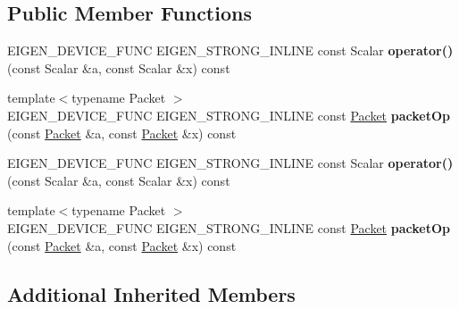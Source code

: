 \subsection*{Public Member Functions}
\begin{DoxyCompactItemize}
\item 
\mbox{\label{struct_eigen_1_1internal_1_1scalar__igammac__op_a3a4928ec0ff01a9934267792838c2eda}} 
E\+I\+G\+E\+N\+\_\+\+D\+E\+V\+I\+C\+E\+\_\+\+F\+U\+NC E\+I\+G\+E\+N\+\_\+\+S\+T\+R\+O\+N\+G\+\_\+\+I\+N\+L\+I\+NE const Scalar {\bfseries operator()} (const Scalar \&a, const Scalar \&x) const
\item 
\mbox{\label{struct_eigen_1_1internal_1_1scalar__igammac__op_a0f697a457a319ce7a678617e74cb0a3d}} 
{\footnotesize template$<$typename Packet $>$ }\\E\+I\+G\+E\+N\+\_\+\+D\+E\+V\+I\+C\+E\+\_\+\+F\+U\+NC E\+I\+G\+E\+N\+\_\+\+S\+T\+R\+O\+N\+G\+\_\+\+I\+N\+L\+I\+NE const \hyperlink{union_eigen_1_1internal_1_1_packet}{Packet} {\bfseries packet\+Op} (const \hyperlink{union_eigen_1_1internal_1_1_packet}{Packet} \&a, const \hyperlink{union_eigen_1_1internal_1_1_packet}{Packet} \&x) const
\item 
\mbox{\label{struct_eigen_1_1internal_1_1scalar__igammac__op_a3a4928ec0ff01a9934267792838c2eda}} 
E\+I\+G\+E\+N\+\_\+\+D\+E\+V\+I\+C\+E\+\_\+\+F\+U\+NC E\+I\+G\+E\+N\+\_\+\+S\+T\+R\+O\+N\+G\+\_\+\+I\+N\+L\+I\+NE const Scalar {\bfseries operator()} (const Scalar \&a, const Scalar \&x) const
\item 
\mbox{\label{struct_eigen_1_1internal_1_1scalar__igammac__op_a0f697a457a319ce7a678617e74cb0a3d}} 
{\footnotesize template$<$typename Packet $>$ }\\E\+I\+G\+E\+N\+\_\+\+D\+E\+V\+I\+C\+E\+\_\+\+F\+U\+NC E\+I\+G\+E\+N\+\_\+\+S\+T\+R\+O\+N\+G\+\_\+\+I\+N\+L\+I\+NE const \hyperlink{union_eigen_1_1internal_1_1_packet}{Packet} {\bfseries packet\+Op} (const \hyperlink{union_eigen_1_1internal_1_1_packet}{Packet} \&a, const \hyperlink{union_eigen_1_1internal_1_1_packet}{Packet} \&x) const
\end{DoxyCompactItemize}
\subsection*{Additional Inherited Members}


